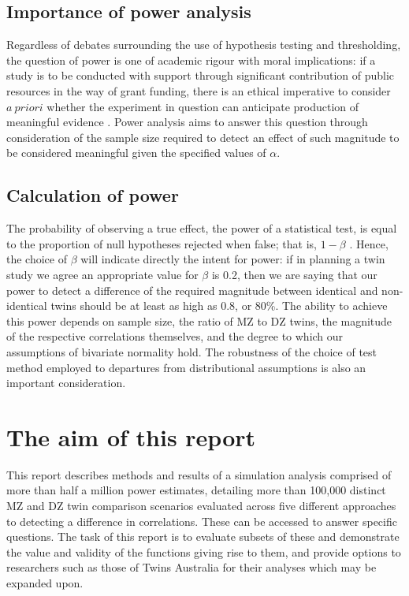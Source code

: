 \subsection{Importance of power analysis}
Regardless of debates surrounding the use of hypothesis testing and thresholding, the question of power is one of academic rigour with moral implications: if a study is to be conducted with support through significant contribution of public resources in the way of grant funding, there is an ethical imperative to consider $a \ priori$ whether the experiment in question can anticipate production of meaningful evidence \cite{Freiman1978,Cohen1988}.  Power analysis aims to answer this question through consideration of the sample size required to detect an effect of such magnitude to be considered meaningful given the specified values of $\alpha$.  

\subsection{Calculation of power}
The probability of observing a true effect, the power of a statistical test, is equal to the proportion of null hypotheses rejected when false; that is, $1 - \beta$ \cite{Cohen1988}.  Hence, the choice of $\beta$ will indicate directly the intent for power: if in planning a twin study we agree an appropriate value for $\beta$ is 0.2, then we are saying that our power to detect a difference of the required magnitude between identical and non-identical twins should be at least as high as 0.8, or 80\%. The ability to achieve this power depends on sample size, the ratio of MZ to DZ twins, the magnitude of the respective correlations themselves, and the degree to which our assumptions of bivariate normality hold. The robustness of the choice of test method employed to departures from distributional assumptions is also an important consideration.

\section{The aim of this report}
This report describes methods and results of a simulation analysis comprised of more than half a million power estimates, detailing more than 100,000 distinct MZ and DZ twin comparison scenarios evaluated across five different approaches to detecting a difference in correlations.  These can be accessed to answer specific questions.  The task of this report is to evaluate subsets of these and demonstrate the value and validity of the functions giving rise to them, and provide options to researchers such as those of Twins Australia for their analyses which may be expanded upon.